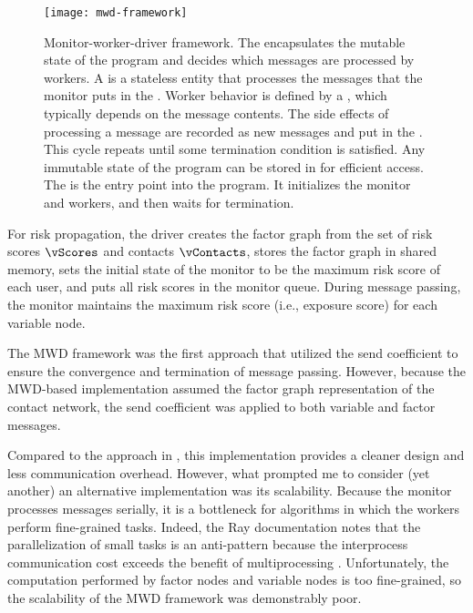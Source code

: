 \begin{figure}[htbp]
\centering
\texttt{[image: mwd-framework]}
\caption[Monitor-worker-driver framework]{Monitor-worker-driver framework. The  encapsulates the mutable state of the program and decides which messages are processed by workers. A  is a stateless entity that processes the messages that the monitor puts in the . Worker behavior is defined by a , which typically depends on the message contents. The side effects of processing a message are recorded as new messages and put in the . This cycle repeats until some termination condition is satisfied. Any immutable state of the program can be stored in  for efficient access. The  is the entry point into the program. It initializes the monitor and workers, and then waits for termination.}
\label{fig:mwd-framework}
\end{figure}

For risk propagation, the driver creates the factor graph from the set of risk scores $\vScores$ and contacts $\vContacts$, stores the factor graph in shared memory, sets the initial state of the monitor to be the maximum risk score of each user, and puts all risk scores in the monitor queue. During message passing, the monitor maintains the maximum risk score (i.e., exposure score) for each variable node.

The MWD framework was the first approach that utilized the send coefficient to ensure the convergence and termination of message passing. However, because the MWD-based implementation assumed the factor graph representation of the contact network, the send coefficient was applied to both variable and factor messages.

Compared to the approach in , this implementation provides a cleaner design and less communication overhead. However, what prompted me to consider (yet another) an alternative implementation was its scalability. Because the monitor processes messages serially, it is a bottleneck for algorithms in which the workers perform fine-grained tasks. Indeed, the Ray documentation notes that the parallelization of small tasks is an anti-pattern because the interprocess communication cost exceeds the benefit of multiprocessing \cite{RayFineGrainedTasks}. Unfortunately, the computation performed by factor nodes and variable nodes is too fine-grained, so the scalability of the MWD framework was demonstrably poor.

